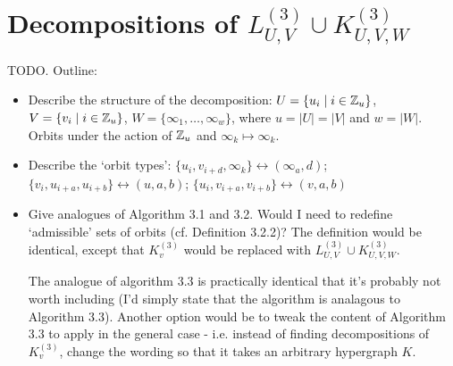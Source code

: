 \section{Decompositions of $L_{U,V}^{(3)} \cup K_{U,V,W}^{(3)}$}

TODO. Outline:

\begin{itemize}
    \item Describe the structure of the decomposition: $U = \{u_i \mid i \in \mathbb{Z}_u\}$, $V = \{v_i \mid i \in \mathbb{Z}_u\}$, $W = \{\infty_1, \ldots, \infty_w\}$, where $u = |U| = |V|$ and $w = |W|$. Orbits under the action of $\mathbb{Z}_u$ and $\infty_k \mapsto \infty_k$.
    \item Describe the `orbit types': $\{u_i, v_{i+d}, \infty_k\} \leftrightarrow (\infty_a, d)$; $\{v_i, u_{i+a}, u_{i+b}\} \leftrightarrow (u, a, b)$; $\{u_i, v_{i+a}, v_{i+b}\} \leftrightarrow (v, a, b)$
    \item Give analogues of Algorithm 3.1 and 3.2. Would I need to redefine `admissible' sets of orbits (cf. Definition 3.2.2)? The definition would be identical, except that $K_{v}^{(3)}$ would be replaced with $L_{U,V}^{(3)} \cup K_{U,V,W}^{(3)}$.

    The analogue of algorithm 3.3 is practically identical that it's probably not worth including (I'd simply state that the algorithm is analagous to Algorithm 3.3). Another option would be to tweak the content of Algorithm 3.3 to apply in the general case - i.e. instead of finding decompositions of $K_{v}^{(3)}$, change the wording so that it takes an arbitrary hypergraph $K$.
\end{itemize}
